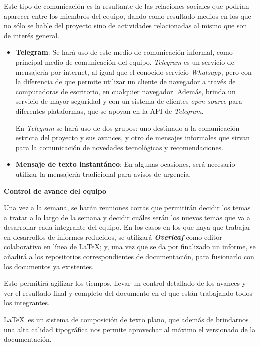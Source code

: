 Este tipo de comunicación es la resultante de las relaciones sociales que podrían aparecer entre los miembros del equipo, dando como resultado medios en los que no sólo se hable del proyecto sino de actividades relacionadas al mismo que son de interés general.
	\begin{itemize}
	\item{\textbf{Telegram}:}
	Se hará uso de este medio de comunicación informal, como principal medio de comunicación del equipo.
    \textit{Telegram} es un servicio de mensajería por internet, al igual que el conocido servicio \textit{Whatsapp}, pero con la diferencia de que permite utilizar un cliente de navegador a través de computadoras de escritorio, en cualquier navegador.
    Además, brinda un servicio de mayor seguridad y con un sistema de clientes \textit{open source} para diferentes plataformas, que se apoyan en la API de \textit{Telegram}.
    
    En \textit{Telegram} se hará uso de dos grupos: uno destinado a la comunicación estricta del proyecto y sus avances, y otro de mensajes informales que sirvan para la comunicación de novedades tecnológicas y recomendaciones.
    
	\item{\textbf{Mensaje de texto instantáneo}:}
    En algunas ocasiones, será necesario utilizar la mensajería tradicional para avisos de urgencia.
	\end{itemize}


\textbf{Control de avance del equipo}

Una vez a la semana, se harán reuniones cortas que permitirán decidir los temas a tratar a lo largo de la semana y decidir cuáles serán los nuevos temas que va a desarrollar cada integrante del equipo.
En los casos en los que haya que trabajar en desarrollos de informes reducidos, se utilizará \textbf{\textit{Overleaf}} como editor colaborativo en línea de \LaTeX; y, una vez que se da por finalizado un informe, se añadirá a los repositorios correspondientes de documentación, para fusionarlo con los documentos ya existentes.

Esto permitirá agilizar los tiempos, llevar un control detallado de los avances y ver el resultado final y completo del documento en el que están trabajando todos los integrantes.

\LaTeX\ es un sistema de composición de texto plano, que además de brindarnos una alta calidad tipográfica nos permite aprovechar al máximo el versionado de la documentación. 
    
